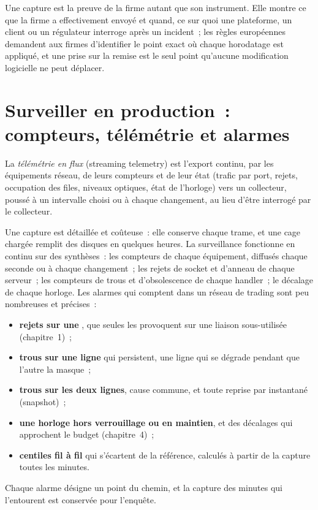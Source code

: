 Une capture est la preuve de la firme autant que son instrument. Elle montre ce que la firme a effectivement envoyé et quand, ce sur quoi une plateforme, un client ou un
régulateur interroge après un incident~; les règles européennes demandent aux firmes d'identifier le point exact où chaque horodatage est appliqué, et une prise sur la
remise est le seul point qu'aucune modification logicielle ne peut déplacer.

\section{Surveiller en production~: compteurs, télémétrie et alarmes}

\begin{definition}\label{def:nw:capturing-and-monitoring-the-network:telemetry}
La \emph{télémétrie en flux} (streaming telemetry) est l'export continu, par les équipements réseau, de leurs compteurs et de leur état
(trafic par port, rejets, occupation des files, niveaux optiques, état de l'horloge) vers un collecteur, poussé à un intervalle choisi ou à chaque changement,
au lieu d'être interrogé par le collecteur.
\end{definition}

Une capture est détaillée et coûteuse~: elle conserve chaque trame, et une cage chargée remplit des disques en quelques heures. La surveillance fonctionne en continu
sur des synthèses~: les compteurs de chaque équipement, diffusés chaque seconde ou à chaque changement~; les rejets de socket et d'anneau de chaque serveur~; les compteurs
de trous et d'obsolescence de chaque handler~; le décalage de chaque horloge. Les alarmes qui comptent dans un réseau de trading sont peu nombreuses et précises~:
\begin{itemize}
\item \textbf{rejets sur une }, que seules les  provoquent sur une liaison sous-utilisée (chapitre~1)~;
\item \textbf{trous sur une ligne} qui persistent, une ligne qui se dégrade pendant que l'autre la masque~;
\item \textbf{trous sur les deux lignes}, cause commune, et toute reprise par instantané (snapshot)~;
\item \textbf{une horloge hors verrouillage ou en maintien}, et des décalages qui approchent le budget (chapitre~4)~;
\item \textbf{centiles fil à fil} qui s'écartent de la référence, calculés à partir de la capture toutes les minutes.
\end{itemize}
Chaque alarme désigne un point du chemin, et la capture des minutes qui l'entourent est conservée pour l'enquête.

